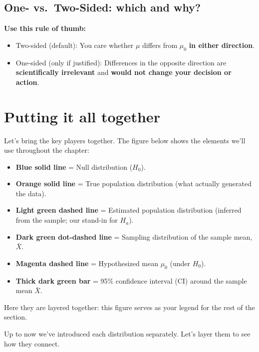 \documentclass[
  letterpaper,
  DIV=11,
  numbers=noendperiod]{scrreprt}
\providecommand{\tightlist}{%
  \setlength{\itemsep}{0pt}\setlength{\parskip}{0pt}}
\begin{document}
\subsection{One- vs.~Two-Sided: which and
why?}\label{one--vs.-two-sided-which-and-why}

\textbf{Use this rule of thumb:}

\begin{itemize}
\tightlist
\item
  Two-sided (default): You care whether \(\mu\) differs from \(\mu_0\)
  \textbf{in either direction}.
\item
  One-sided (only if justified): Differences in the opposite direction
  are \textbf{scientifically irrelevant} and \textbf{would not change
  your decision or action}.
\end{itemize}

\section{Putting it all together}\label{putting-it-all-together}

Let's bring the key players together. The figure below shows the
elements we'll use throughout the chapter:

\begin{itemize}
\tightlist
\item
  \textbf{Blue solid line} = Null distribution (\(H_0\)).
\item
  \textbf{Orange solid line} = True population distribution (what
  actually generated the data).
\item
  \textbf{Light green dashed line} = Estimated population distribution
  (inferred from the sample; our stand-in for \(H_a\)).
\item
  \textbf{Dark green dot-dashed line} = Sampling distribution of the
  sample mean, \(\bar{X}\).
\item
  \textbf{Magenta dashed line} = Hypothesized mean \(\mu_0\) (under
  \(H_0\)).\\
\item
  \textbf{Thick dark green bar} = 95\% confidence interval (CI) around
  the sample mean \(\bar{X}\).
\end{itemize}

Here they are layered together: this figure serves as your legend for
the rest of the section.

Up to now we've introduced each distribution separately. Let's layer
them to see how they connect.
\end{document}
